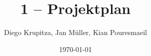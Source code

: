 \usepackage[utf8]{inputenc}
\usepackage[T1]{fontenc}

\usepackage[ngerman]{isodate, babel}
\usepackage[german=quotes]{csquotes}

\usepackage[hyphens]{url}
\usepackage[]{hyperref}
\hypersetup{colorlinks, citecolor=black, linkcolor=black, urlcolor=black}

\usepackage{titling}
\title{1 – Projektplan}
\author{Diego Krupitza, Jan Müller, Kian Pouresmaeil}
\date{\today}

\usepackage{fancyhdr}
\pagestyle{fancy}
\fancyhead{} %
\renewcommand{\headrulewidth}{0pt} %
\fancyfoot{} %
\fancyfoot[LE,RO]{\thepage} %
\fancyfoot[RE,LO]{\thetitle}
